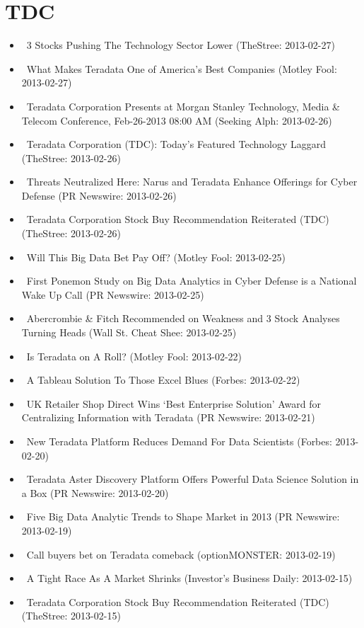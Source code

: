 \documentclass[11pt,asymmetric]{article}
\begin{document}
\section*{TDC}
\begin{itemize}
\item\ 3 Stocks Pushing The Technology Sector Lower (TheStree: 2013-02-27)
\item\ What Makes Teradata One of America's Best Companies (Motley Fool: 2013-02-27)
\item\ Teradata Corporation Presents at Morgan Stanley Technology, Media \& Telecom Conference, Feb-26-2013 08:00 AM (Seeking Alph: 2013-02-26)
\item\ Teradata Corporation (TDC): Today's Featured Technology Laggard (TheStree: 2013-02-26)
\item\ Threats Neutralized Here: Narus and Teradata Enhance Offerings for Cyber Defense (PR Newswire: 2013-02-26)
\item\ Teradata Corporation Stock Buy Recommendation Reiterated (TDC) (TheStree: 2013-02-26)
\item\ Will This Big Data Bet Pay Off? (Motley Fool: 2013-02-25)
\item\ First Ponemon Study on Big Data Analytics in Cyber Defense is a National Wake Up Call (PR Newswire: 2013-02-25)
\item\ Abercrombie \& Fitch Recommended on Weakness and 3 Stock Analyses Turning Heads (Wall St. Cheat Shee: 2013-02-25)
\item\ Is Teradata on A Roll? (Motley Fool: 2013-02-22)
\item\ A Tableau Solution To Those Excel Blues (Forbes: 2013-02-22)
\item\ UK Retailer Shop Direct Wins `Best Enterprise Solution' Award for Centralizing Information with Teradata (PR Newswire: 2013-02-21)
\item\ New Teradata Platform Reduces Demand For Data Scientists (Forbes: 2013-02-20)
\item\ Teradata Aster Discovery Platform Offers Powerful Data Science Solution in a Box (PR Newswire: 2013-02-20)
\item\ Five Big Data Analytic Trends to Shape Market in 2013 (PR Newswire: 2013-02-19)
\item\ Call buyers bet on Teradata comeback (optionMONSTER: 2013-02-19)
\item\ A Tight Race As A Market Shrinks (Investor's Business Daily: 2013-02-15)
\item\ Teradata Corporation Stock Buy Recommendation Reiterated (TDC) (TheStree: 2013-02-15)

\end{itemize}
\end{document}
